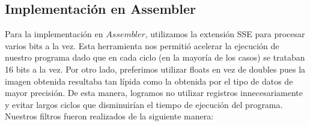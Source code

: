 \documentclass[10pt, a4paper]{article}
\begin{document}
\subsection{Implementación en Assembler}
Para la implementación en $Assembler$, utilizamos la extensión SSE para procesar varios bits a la vez. Esta herramienta nos permitió acelerar la ejecución de nuestro programa dado que en cada ciclo (en la mayoría de los casos) se trataban 16 bits a la vez.
Por otro lado, preferimos utilizar floats en vez de doubles pues la imagen obtenida resultaba tan lípida como la obtenida por el tipo de datos de mayor precisión. De esta manera, logramos no utilizar registros innecesariamente y evitar largos ciclos que disminuirían el tiempo de ejecución del programa.  
\newline
Nuestros filtros fueron realizados de la siguiente manera:
\end{document}

